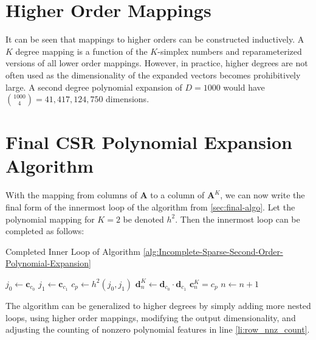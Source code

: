\documentclass{article}
\begin{document}
\section{Higher Order Mappings}
It can be seen that mappings to higher orders can be constructed inductively.
A $K$ degree mapping is a function of the $K$-simplex numbers and reparameterized versions of all lower order mappings.
However, in practice, higher degrees are not often used as the dimensionality of the expanded vectors becomes prohibitively large.
A second degree polynomial expansion of $D=1000$ would have $\binom{1000}{4} = 41,417,124,750$ dimensions.

\section{Final CSR Polynomial Expansion Algorithm}
With the mapping from columns of $\bm{A}$ to a column of $\bm{A}^K$, we can now write the final form of the innermost loop of the algorithm from \ref{sec:final-algo}.
Let the polynomial mapping for $K=2$ be denoted $h^2$.
Then the innermost loop can be completed as follows: %

\begin{algorithm}[H]
   \caption*{Completed Inner Loop of Algorithm \ref{alg:Incomplete-Sparse-Second-Order-Polynomial-Expansion}}
   \label{alg:Inner-Loop-of-Completed-Sparse-Second-Order-Polynomial-Expansion}
\begin{algorithmic}[1]
      \STATE $j_0 \gets \bm{c}_{c_0}$
      \STATE $j_1 \gets \bm{c}_{c_1}$
      \STATE $c_p \gets h^2(j_0, j_1)$
      \STATE $\bm{d}^K_{n} \gets \bm{d}_{c_0} \cdot \bm{d}_{c_1}$
      \STATE $\bm{c}^K_{n} = c_p$
      \STATE $n \gets n + 1$
  \ENDFOR
\end{algorithmic}
\end{algorithm}

The algorithm can be generalized to higher degrees by simply adding more nested loops, using higher order mappings, modifying the output dimensionality, and adjusting the counting of nonzero polynomial features in line \ref{li:row_nnz_count}.
\end{document}
